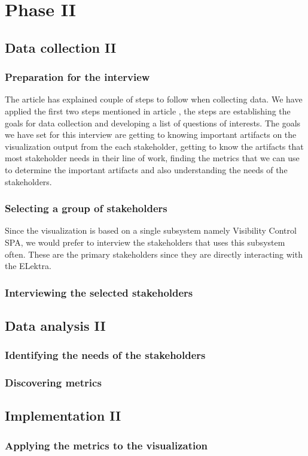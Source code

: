 \section{Phase II}

\subsection{Data collection II}

\subsubsection{Preparation for the interview}
The article \cite{Basili} has explained couple of steps to follow when collecting data. We have applied the first two steps mentioned in article \cite{Basili}, the steps are establishing the goals for data collection and developing a list of questions of interests. The goals we have set for this interview are getting to knowing important artifacts on the visualization output from the each stakeholder, getting to know the artifacts that most stakeholder needs in their line of work, finding the metrics that we can use to determine the important artifacts and also understanding the needs of the stakeholders. 

\subsubsection{Selecting a group of stakeholders}
Since the visualization is based on a single subsystem namely Visibility Control SPA, we would prefer to interview the stakeholders that uses this subsystem often. These are the primary stakeholders since they are directly interacting with the ELektra.

\subsubsection{Interviewing the selected stakeholders}
\todo{[to be filled in]}

\subsection{Data analysis II}

\subsubsection{Identifying the needs of the stakeholders}
\todo{[to be filled in]}

\subsubsection{Discovering metrics}
\todo{[to be filled in]}

\subsection{Implementation II}

\subsubsection{Applying the metrics to the visualization}
\todo{[to be filled in]}
